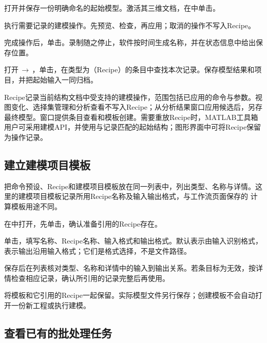 \begin{steps}
  \item 打开并保存一份明确命名的起始模型。激活其三维文档，在中单击。
  \item 执行需要记录的建模操作。先预览、检查，再应用；取消的操作不写入Recipe。
  \item 完成操作后，单击。录制随之停止，软件按时间生成名称，并在状态信息中给出保存位置。
  \item 打开\,$\rightarrow$\,，单击，在类型为（Recipe）的条目中查找本次记录。保存模型结果和项目，并把起始输入一同归档。
\end{steps}

Recipe记录当前结构文档中受支持的建模操作，范围包括已应用的命令与参数。视图变化、选择集管理和分析查看不写入Recipe；从分析结果窗口应用候选后，另存最终模型。窗口提供条目查看和模板创建。需要重放Recipe时，MATLAB\regmark{}工具箱用户可采用建模API，并使用与记录匹配的起始结构；图形界面中可将Recipe保留为操作记录。

\subsection{建立建模项目模板}\label{sec:modeling-template-reference}

把命令预设、Recipe和建模项目模板放在同一列表中，列出类型、名称与详情。这里的建模项目模板记录所用Recipe名称及输入输出格式，与工作流页面保存的  计算模板用途不同。

\begin{steps}
  \item 在中打开，先单击，确认准备引用的Recipe存在。
  \item 单击，填写名称、Recipe名称、输入格式和输出格式。默认表示由输入识别格式，表示输出沿用输入格式；它们是格式选择，不是文件路径。
  \item 保存后在列表核对类型、名称和详情中的输入到输出关系。若条目标为无效，按详情检查相应记录，确认所引用的记录完整后再使用。
  \item 将模板和它引用的Recipe一起保留。实际模型文件另行保存；创建模板不会自动打开一份新工程或执行建模。
\end{steps}

\subsection{查看已有的批处理任务}\label{sec:modeling-jobs-reference}


